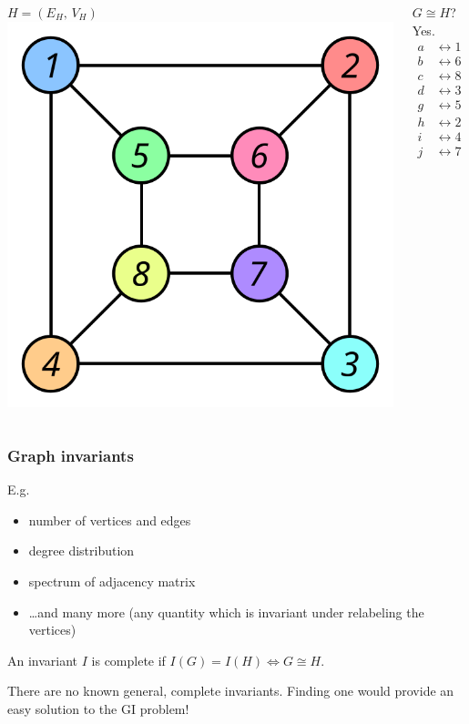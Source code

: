 \documentclass{beamer}
\begin{document}
\begin{frame}[t]
\begin{columns}[T]
    \centering
    $H=(E_H,\,V_H)$ \\[4ex]
    \includegraphics[scale=0.36]{Graph_isomorphism_b}

    \centering
    \alert<1|handout:1>{$G \cong H$?}
     {%
      \alert{Yes.}
      \begin{align*}
        a &\leftrightarrow 1 \\
        b &\leftrightarrow 6 \\
        c &\leftrightarrow 8 \\
        d &\leftrightarrow 3 \\
        g &\leftrightarrow 5 \\
        h &\leftrightarrow 2 \\
        i &\leftrightarrow 4 \\
        j &\leftrightarrow 7
      \end{align*}
    }
  \end{columns}
\end{frame}
\begin{frame}
  \frametitle{Graph invariants}
  E.g.
  \begin{itemize}
    \item number of vertices and edges
    \item degree distribution
    \item spectrum of adjacency matrix
    \item \ldots and many more (any quantity which is invariant under
      relabeling the vertices)
  \end{itemize}
  \begin{definition}
    An invariant $I$ is \alert{complete} if $I(G) = I(H) \iff G \cong H$.
  \end{definition}
  There are no known general, complete invariants. Finding one would provide an
  easy solution to the GI problem!
\end{frame}
\end{document}
